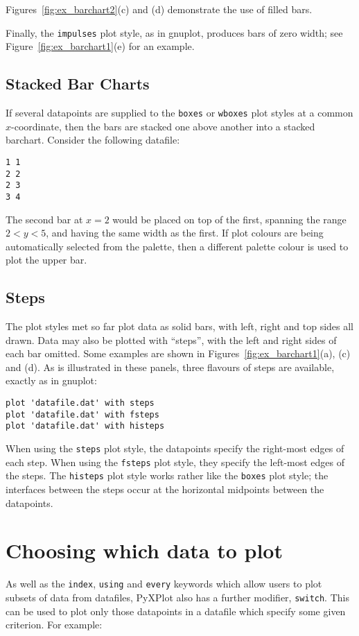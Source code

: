 \noindent Figures~\ref{fig:ex_barchart2}(c) and (d) demonstrate the use of
filled bars.

Finally, the {\tt impulses} plot style, as in gnuplot, produces bars of zero
width; see Figure~\ref{fig:ex_barchart1}(e) for an example.

\subsection{Stacked Bar Charts}

If several datapoints are supplied to the {\tt boxes} or {\tt wboxes}
plot styles at a common $x$-coordinate, then the bars are stacked one above
another into a stacked barchart. Consider the following datafile:

\begin{verbatim} 
1 1
2 2
2 3
3 4
\end{verbatim}

\noindent The second bar at $x=2$ would be placed on top of the first, spanning
the range $2<y<5$, and having the same width as the first. If plot colours are
being automatically selected from the palette, then a different palette colour
is used to plot the upper bar.

\subsection{Steps}

The plot styles met so far plot data as solid bars, with left, right and top
sides all drawn. Data may also be plotted with ``steps'', with the left and
right sides of each bar omitted. Some examples are shown in
Figures~\ref{fig:ex_barchart1}(a), (c) and (d).  As is illustrated in these
panels, three flavours of steps are available, exactly as in gnuplot:

\begin{verbatim}
plot 'datafile.dat' with steps 
plot 'datafile.dat' with fsteps 
plot 'datafile.dat' with histeps
\end{verbatim}

When using the {\tt steps} plot style, the datapoints specify the right-most
edges of each step. When using the {\tt fsteps} plot style, they specify the
left-most edges of the steps. The {\tt histeps} plot style works rather like
the {\tt boxes} plot style; the interfaces between the steps occur at the
horizontal midpoints between the datapoints.

\section{Choosing which data to plot}
\label{select_modifier} 
As well as the {\tt index}, {\tt using} and {\tt every} keywords which
allow users to plot subsets of data from datafiles, PyXPlot also has a further
modifier, {\tt switch}. This can be used to
plot only those datapoints in a datafile which specify some given criterion. For
example:

